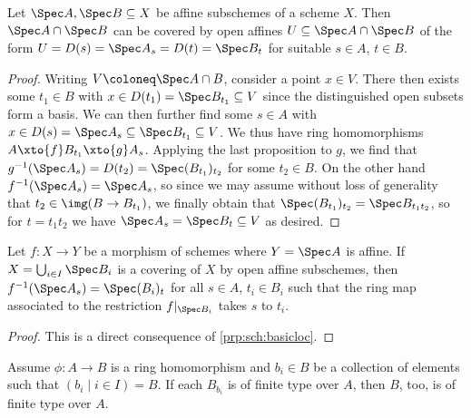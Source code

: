\documentclass[wip, algebra]{bsteffan-lecturenotes}
\begin{document}
\begin{proposition}
	Let $\Spec A, \Spec B \subseteq X$ be affine subschemes of a scheme $X$. 
	Then $\Spec A \cap \Spec B$ can be covered by open affines $U \subseteq \Spec A \cap \Spec B$ of the form $U = D(s) = \Spec A_s = D(t) = \Spec B_t$ for suitable $s \in A$, $t \in B$.
\end{proposition}
\begin{proof}
	Writing $V \coloneq \Spec A \cap B$, consider a point $x \in V$.
	There then exists some $t_1 \in B$ with $x \in D(t_1) = \Spec B_{t_1} \subseteq V$ since the distinguished open subsets form a basis.
	We can then further find some $s \in A$ with $x \in D(s) = \Spec A_s \subseteq \Spec B_{t_1} \subseteq V$.
	We thus have ring homomorphisms $A \xto{f} B_{t_1} \xto{g} A_s$.
	Applying the last proposition to $g$, we find that $g^{-1}(\Spec A_s) = D(t_2) = \Spec (B_{t_1})_{t_2}$ for some $t_2 \in B$.
	On the other hand $f^{-1}(\Spec A_s) = \Spec A_s$, so since we may assume without loss of generality that $t_2 \in \img(B \to B_{t_1})$, we finally obtain that $\Spec (B_{t_1})_{t_2} = \Spec B_{t_1 t_2}$, so for $t = t_1 t_2$ we have $\Spec A_s = \Spec B_t \subseteq V$ as desired.
\end{proof}
\begin{proposition}
	Let $f\colon X \to Y$ be a morphism of schemes where $Y = \Spec A$ is affine.
	If $X = \bigcup_{i \in I} \Spec B_i$ is a covering of $X$ by open affine subschemes, then $f^{-1}(\Spec A_s) = \Spec (B_i)_t$ for all $s \in A$, $t_i \in B_i$ such that the ring map associated to the restriction $f|_{\Spec B_i}$ takes $s$ to $t_i$.
\end{proposition}
\begin{proof}
	This is a direct consequence of \cref{prp:sch:basicloc}.
\end{proof}
\begin{proposition}
	Assume $\phi\colon A \to B$ is a ring homomorphism and $b_i \in B$ be a collection of elements such that $(b_i \mid i \in I) = B$.
	If each $B_{b_i}$ is of finite type over $A$, then $B$, too, is of finite type over $A$.
\end{proposition}
\end{document}
